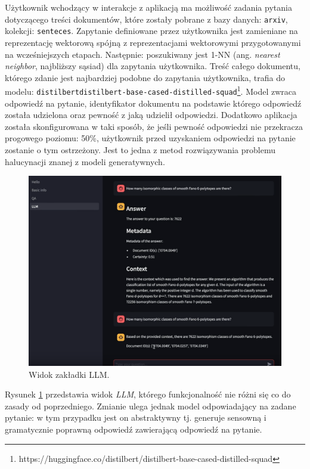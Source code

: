 \documentclass[10pt]{article}
\begin{document}
Użytkownik wchodzący w interakcje z aplikacją ma możliwość zadania pytania dotyczącego treści dokumentów, które zostały pobrane z bazy danych: \texttt{arxiv}, kolekcji: \texttt{senteces}. Zapytanie definiowane przez użytkownika jest zamieniane na reprezentację wektorową spójną z reprezentacjami wektorowymi przygotowanymi na wcześniejszych etapach. Następnie: poszukiwany jest 1-NN (ang. \emph{nearest neighbor}, najbliższy sąsiad) dla zapytania użytkownika. Treść całego dokumentu, którego zdanie jest najbardziej podobne do zapytania użytkownika, trafia do modelu: \texttt{distilbert\/distilbert-base-cased-distilled-squad}\footnote{https://huggingface.co/distilbert/distilbert-base-cased-distilled-squad}. Model zwraca odpowiedź na pytanie, identyfikator dokumentu na podstawie którego odpowiedź została udzielona oraz pewność z jaką udzielił odpowiedzi. Dodatkowo aplikacja została skonfigurowana w taki sposób, że jeśli pewność odpowiedzi nie przekracza progowego poziomu: 50\%, użytkownik przed uzyskaniem odpowiedzi na pytanie zostanie o tym ostrzeżony. Jest to jedna z metod rozwiązywania problemu halucynacji znanej z modeli generatywnych.

\begin{figure}[h]
    \centering
    \includegraphics[width=1.0\textwidth]{images/LLM-view.png}
    \caption{Widok zakładki LLM.}
    \label{fig:llm}
\end{figure}

Rysunek \ref{fig:llm} przedstawia widok \emph{LLM}, którego funkcjonalność nie różni się co do zasady od poprzedniego. Zmianie ulega jednak model odpowiadający na zadane pytanie: w tym przypadku jest on abstraktywny tj. generuje sensowną i gramatycznie poprawną odpowiedź zawierającą odpowiedź na pytanie. 
\end{document}
